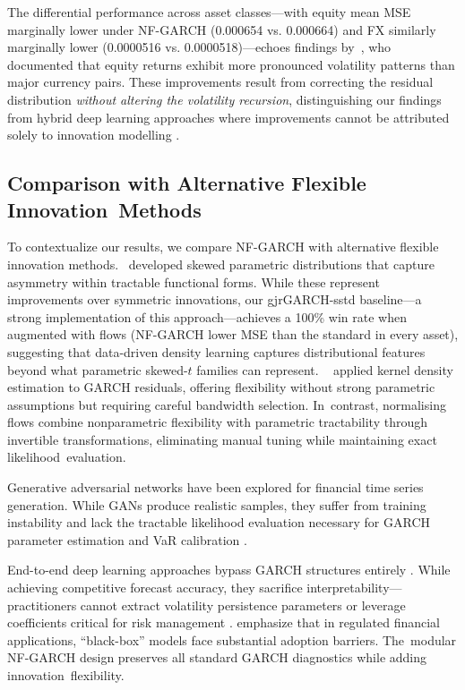 \documentclass[risks,article,accept,pdftex,moreauthors]{Definitions/mdpi}
\begin{document}
The differential performance across asset classes—with equity mean MSE marginally lower under NF-GARCH (0.000654 vs. 0.000664) and FX similarly marginally lower (0.0000516 vs. 0.0000518)—echoes findings by~\cite{andersen2001distribution}, who documented that equity returns exhibit more pronounced volatility patterns than major currency pairs. These improvements result from correcting the residual distribution \emph{without altering the volatility recursion}, distinguishing our findings from hybrid deep learning approaches  where improvements cannot be attributed solely to innovation modelling \citep{kim2018forecasting}.

\subsection{Comparison with Alternative Flexible Innovation~Methods}

To contextualize our results, we compare NF-GARCH with alternative flexible innovation methods.~\cite{fernandez1998multivariate} developed skewed parametric distributions that capture asymmetry within tractable functional forms. While these represent improvements over symmetric innovations, our gjrGARCH-sstd baseline—a strong implementation of this approach—achieves a 100\% win rate when augmented with flows (NF-GARCH lower MSE than the standard in every asset), suggesting that data-driven density learning captures distributional features beyond what parametric skewed-$t$ families can represent.
~\cite{engle1993measuring} applied kernel density estimation to GARCH residuals, offering flexibility without strong parametric assumptions but requiring careful bandwidth selection. In~contrast, normalising flows combine nonparametric flexibility with parametric tractability through invertible transformations, eliminating manual tuning while maintaining exact likelihood~evaluation.

Generative adversarial networks \citep{goodfellow2014generative, wiese2020quant} have been explored for financial time series generation. While GANs produce realistic samples, they suffer from training instability  and lack the tractable likelihood evaluation necessary for GARCH parameter estimation and VaR calibration \citep{arjovsky2017wasserstein}.

End-to-end deep learning approaches  bypass GARCH structures entirely \citep{kim2018forecasting}. While achieving competitive forecast accuracy, they sacrifice interpretability—practitioners cannot extract volatility persistence parameters or leverage coefficients critical for risk management \citep{rudin2019stop}. \cite{harvey2022machine} emphasize that in regulated financial applications, ``black-box'' models face substantial adoption barriers. The~modular NF-GARCH design preserves all standard GARCH diagnostics while adding innovation~flexibility.
\end{document}
